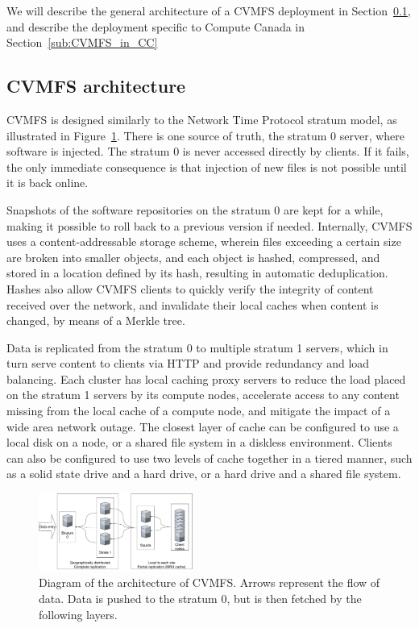 \documentclass[sigconf]{acmart}
\begin{document}
We will describe the general architecture of a CVMFS deployment in Section~\ref{sub:CVMFS_structure}, and describe the deployment specific to Compute Canada in Section~\ref{sub:CVMFS_in_CC}

\subsection{CVMFS architecture}
\label{sub:CVMFS_structure}
CVMFS is designed similarly to the Network Time Protocol stratum model, as illustrated in Figure~\ref{fig:CVMFS_structure}. There is one source of truth, the stratum 0 server, where software is injected.  The stratum 0 is never accessed directly by clients. If it fails, the only immediate consequence is that injection of new files is not possible until it is back online. 

Snapshots of the software repositories on the stratum 0 are kept for a while, making it possible to roll back to a previous version if needed. Internally, CVMFS uses a content-addressable storage scheme, wherein files exceeding a certain size are broken into smaller objects, and each object is hashed, compressed, and stored in a location defined by its hash, resulting in automatic deduplication. Hashes also allow CVMFS clients to quickly verify the integrity of content received over the network, and invalidate their local caches when content is changed, by means of a Merkle tree.

Data is replicated from the stratum 0 to multiple stratum 1 servers, which in turn serve content to clients via HTTP and provide redundancy and load balancing. Each cluster has local caching proxy servers to reduce the load placed on the stratum 1 servers by its compute nodes, accelerate access to any content missing from the local cache of a compute node, and mitigate the impact of a wide area network outage. The closest layer of cache can be configured to use a local disk on a node, or a shared file system in a diskless environment. Clients can also be configured to use two levels of cache together in a tiered manner, such as a solid state drive and a hard drive, or a hard drive and a shared file system.

\begin{figure}
  \includegraphics[width=0.45\textwidth]{CVMFS-structure.pdf}
  \caption{Diagram of the architecture of CVMFS. Arrows represent the flow of data. Data is pushed to the stratum 0, but is then fetched by the following layers.}
  \label{fig:CVMFS_structure}
\end{figure}
\end{document}
